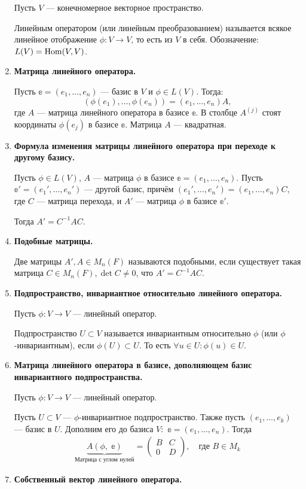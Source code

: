\begin{enumerate}
Пусть $V$ --- конечномерное векторное пространство.

Линейным оператором (или линейным преобразованием) называется всякое линейное отображение $\phi \colon V \rightarrow V$, то есть из $V$ в себя. Обозначение: $L(V) = \mathrm{Hom}(V, V)$.
\item \textbf{Матрица линейного оператора.}

Пусть $\mathbb{e} = (e_1, \ldots, e_n)$ --- базис в $V$ и $\phi \in L(V)$. Тогда:
$$
\left(\phi(e_1), \ldots, \phi(e_n)\right) = \left(e_1, \ldots, e_n\right)A,
$$
где $A$ --- матрица линейного оператора в базисе $\mathbb{e}$. В столбце $A^{\left( j\right)}$ стоят координаты $\phi(e_j)$ в базисе $\mathbb{e}$. Матрица $A$ --- квадратная. 
\item \textbf{Формула изменения матрицы линейного оператора при переходе к другому базису.}

Пусть $\phi \in L(V)$, $A$ --- матрица $\phi$ в базисе $\mathbb{e} = (e_1, \ldots, e_n)$. Пусть $\mathbb{e}' = (e_1', \ldots, e_n')$ --- другой базис, причём $(e_1', \ldots, e_n') = (e_1, \ldots, e_n)C$, где $C$ --- матрица перехода, и $A'$ --- матрица $\phi$ в базисе $\mathbb{e}'$.

Тогда $A' = C^{-1}AC$.
\item \textbf{Подобные матрицы.}

Две матрицы $A', A \in M_n(F)$ называются подобными, если существует такая матрица $C \in M_n(F), \det C \neq 0$, что $A' = C^{-1}AC$.
\item \textbf{Подпространство, инвариантное относительно линейного оператора.}

Пусть $\phi\colon V \rightarrow V$ --- линейный оператор.

Подпространство $U \subset V$ называется инвариантным относительно $\phi$ (или $\phi$-инвариантным), если $\phi(U)\subset U$. То есть $\forall u\in U \colon \phi(u)\in U$. 
\item \textbf{Матрица линейного оператора в базисе, дополняющем базис инвариантного подпространства.}

Пусть $\phi\colon V \rightarrow V$ --- линейный оператор.

Пусть $U\subset V$ --- $\phi$-инвариантное подпространство. Также пусть $(e_1, \ldots, e_k)$ --- базис в $U$. Дополним его до базиса $V\colon$ $\mathbb{e} = (e_1, \ldots, e_n)$. Тогда
\begin{gather}
    \underbrace{A(\phi,\;\mathbb{e})}_{\text{Матрица с углом нулей}} = \begin{pmatrix}
    B& C \\
    0& D
    \end{pmatrix}, \quad\text{где $B\in M_k$}
\end{gather}
\item \textbf{Собственный вектор линейного оператора.}


\end{enumerate}
